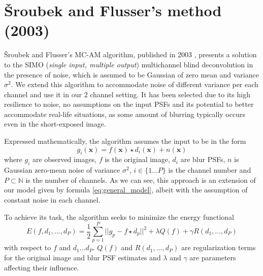 \documentclass[12pt,notitlepage]{report}
\begin{document}
\section{Šroubek and Flusser's method (2003)}
\label{sec:srou03}

Šroubek and Flusser's MC-AM algorithm, published in 2003 \cite{srou03}, presents a solution to the SIMO ({\em single input, multiple output}) multichannel blind deconvolution in the presence of noise, which is assumed to be Gaussian of zero mean and variance $\sigma^2$. We extend this algorithm to accommodate noise of different variance per each channel and use it in our 2 channel setting. It has been selected due to its high resilience to noise, no assumptions on the input PSFs and its potential to better accommodate real-life situations, as some amount of blurring typically occurs even in the short-exposed image. 

Expressed mathematically, the algorithm assumes the input to be in the form
\begin{equation}
\label{eq:srou03_general_model}
	g_i(\mathbf{x}) = f(\mathbf{x}) \star d_i(\mathbf{x}) + n(\mathbf{x}) 	
\end{equation}
where $g_i$ are observed images, $f$ is the original image, $d_i$ are blur PSFs, $n$ is Gaussian zero-mean noise of variance $\sigma^2$, $i \in \{1 \dots P\}$ is the channel number and $P \subset \mathbb{N}$ is the number of channels. As we can see, this approach is an extension of our model given by formula \ref{eq:general_model}, albeit with the assumption of constant noise in each channel. 

To achieve its task, the algorithm seeks to minimize the energy functional 
\begin{equation}
\label{eq:srou03_energy}
	E(f, d_1, \dots, d_P) = \frac{1}{2} \sum_{p=1}^{P} || g_p - f \star d_p ||^2 + \lambda Q(f) + \gamma R(d_1, \dots , d_P)	
\end{equation}
with respect to $f$ and $d_1 \dots d_P$. $Q(f)$ and $R(d_1, \dots, d_P)$ are regularization terms for the original image and blur PSF estimates and $\lambda$ and $\gamma$ are parameters affecting their influence. 
\end{document}

